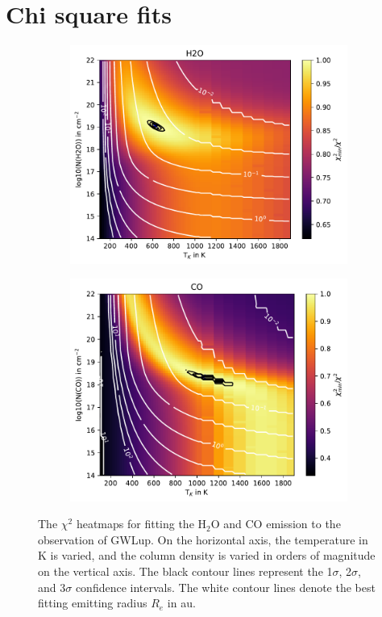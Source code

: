 \documentclass[oneside, single, authoryear, semicolon, 12pt]{lion-msc}
\newcommand{\4}{$_4$}
\newcommand{\3}{$_3$}
\newcommand{\2}{$_2$}
\begin{document}
\chapter{Chi square fits}\label{app: chi square}
\begin{figure}[!ht]
    \centering
    \begin{subfigure}[b]{0.49\textwidth}
        \centering
        \includegraphics[width=\textwidth]{radexpy_niels/Radexpy_for_Niels/chi2_map_H2O_GWLup.pdf}
    \end{subfigure}
    \hfill
    \begin{subfigure}[b]{0.49\textwidth}
        \centering
        \includegraphics[width=\textwidth]{radexpy_niels/Radexpy_for_Niels/chi2_map_CO_GWLup.pdf}
    \end{subfigure}
    \caption{The $\chi^2$ heatmaps for fitting the H\2O and CO emission to the observation of GWLup. On the horizontal axis, the temperature in K is varied, and the column density is varied in orders of magnitude on the vertical axis. The black contour lines represent the 1$\sigma$, 2$\sigma$, and 3$\sigma$ confidence intervals. The white contour lines denote the best fitting emitting radius $R_e$ in au.}
\end{figure}
\end{document}
